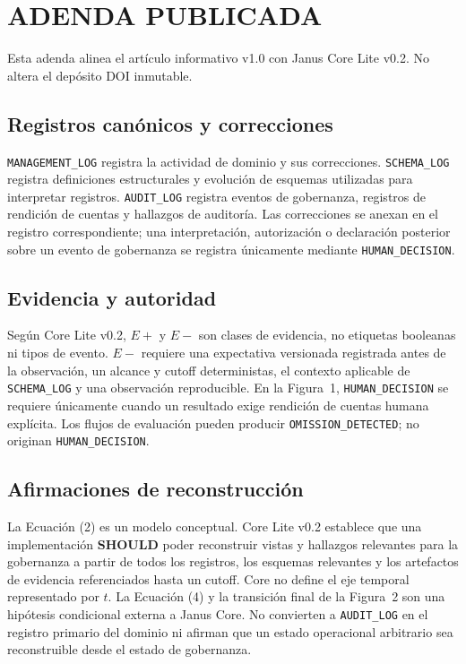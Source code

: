 \documentclass[conference]{IEEEtran}
\begin{document}
\section*{ADENDA PUBLICADA}
Esta adenda alinea el artículo informativo v1.0 con Janus Core Lite v0.2. No altera el depósito DOI inmutable.

\subsection*{Registros canónicos y correcciones}
\texttt{MANAGEMENT\_LOG} registra la actividad de dominio y sus correcciones. \texttt{SCHEMA\_LOG} registra definiciones estructurales y evolución de esquemas utilizadas para interpretar registros. \texttt{AUDIT\_LOG} registra eventos de gobernanza, registros de rendición de cuentas y hallazgos de auditoría. Las correcciones se anexan en el registro correspondiente; una interpretación, autorización o declaración posterior sobre un evento de gobernanza se registra únicamente mediante \texttt{HUMAN\_DECISION}.

\subsection*{Evidencia y autoridad}
Según Core Lite v0.2, $E+$ y $E-$ son clases de evidencia, no etiquetas booleanas ni tipos de evento. $E-$ requiere una expectativa versionada registrada antes de la observación, un alcance y cutoff deterministas, el contexto aplicable de \texttt{SCHEMA\_LOG} y una observación reproducible. En la Figura~1, \texttt{HUMAN\_DECISION} se requiere únicamente cuando un resultado exige rendición de cuentas humana explícita. Los flujos de evaluación pueden producir \texttt{OMISSION\_DETECTED}; no originan \texttt{HUMAN\_DECISION}.

\subsection*{Afirmaciones de reconstrucción}
La Ecuación (2) es un modelo conceptual. Core Lite v0.2 establece que una implementación \textbf{SHOULD} poder reconstruir vistas y hallazgos relevantes para la gobernanza a partir de todos los registros, los esquemas relevantes y los artefactos de evidencia referenciados hasta un cutoff. Core no define el eje temporal representado por $t$. La Ecuación (4) y la transición final de la Figura~2 son una hipótesis condicional externa a Janus Core. No convierten a \texttt{AUDIT\_LOG} en el registro primario del dominio ni afirman que un estado operacional arbitrario sea reconstruible desde el estado de gobernanza.
\end{document}
